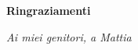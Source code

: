 \thispagestyle{empty}

\begin{center}
  {\bf \Huge Ringraziamenti}
\end{center}

\vspace{4cm}


\emph{
  Ai miei genitori, a Mattia
}
